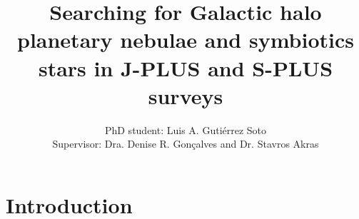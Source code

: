 \documentclass{article}
\title{Searching for Galactic halo planetary nebulae and symbiotics stars in J-PLUS and S-PLUS surveys }
\author{
         PhD student: Luis A. Gutiérrez Soto\\
         Supervisor: Dra. Denise R. Gon\c{c}alves and Dr. Stavros Akras
}
\newcommand{\gt}{>}
\newcommand\U[1]{\ensuremath{\mathrm{#1}}}
\newcommand\msol{M_\odot}
\newcommand\K{\U{K}}
\begin{document}
\maketitle

\section{Introduction}
\label{sec:intro}


\end{document}
